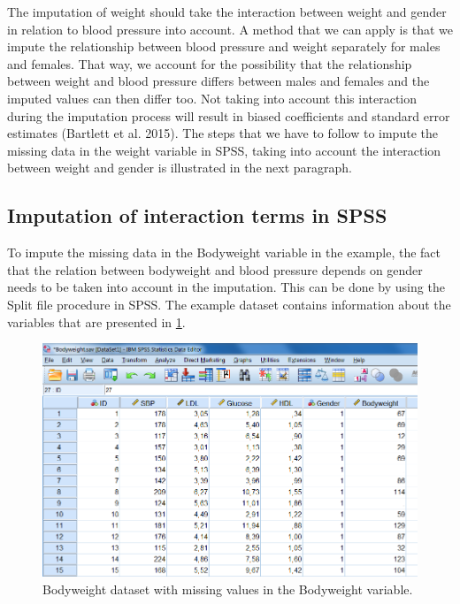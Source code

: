 \documentclass[]{book}
\theoremstyle{definition}
\theoremstyle{definition}
\theoremstyle{definition}
\theoremstyle{remark}
\begin{document}
The imputation of weight should take the interaction between weight and
gender in relation to blood pressure into account. A method that we can
apply is that we impute the relationship between blood pressure and
weight separately for males and females. That way, we account for the
possibility that the relationship between weight and blood pressure
differs between males and females and the imputed values can then differ
too. Not taking into account this interaction during the imputation
process will result in biased coefficients and standard error estimates
(Bartlett et al. 2015). The steps that we have to follow to impute the
missing data in the weight variable in SPSS, taking into account the
interaction between weight and gender is illustrated in the next
paragraph.

\subsection{Imputation of interaction terms in
SPSS}\label{imputation-of-interaction-terms-in-spss}

To impute the missing data in the Bodyweight variable in the example,
the fact that the relation between bodyweight and blood pressure depends
on gender needs to be taken into account in the imputation. This can be
done by using the Split file procedure in SPSS. The example dataset
contains information about the variables that are presented in
\ref{fig:fig6-1}.

\begin{figure}

{\centering \includegraphics[width=0.9\linewidth]{images/fig6.1} 

}

\caption{Bodyweight dataset with missing values in the Bodyweight variable.}\label{fig:fig6-1}
\end{figure}
\end{document}
